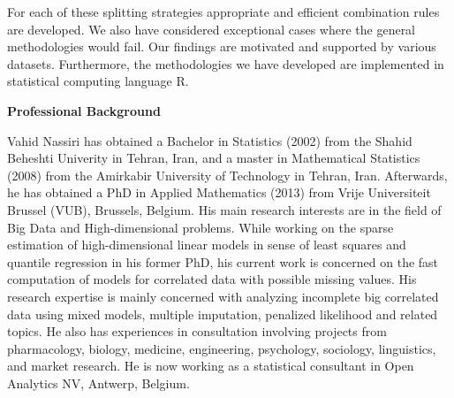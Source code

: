 \documentclass[14pt]{article}
\begin{document}
For each of these splitting strategies appropriate and efficient combination rules are developed. We also have considered exceptional cases where the general methodologies would fail. Our findings are motivated and supported by various datasets. Furthermore, the methodologies we have developed are implemented in statistical computing language R.
\vspace{1cm}
\begin{center}
{\large{\textbf{Professional Background}}}
\end{center}
\vspace{0.5cm}
Vahid Nassiri  has obtained a Bachelor in Statistics (2002) from the Shahid Beheshti Univerity in Tehran, Iran, and a master in Mathematical Statistics (2008) from the Amirkabir University of Technology in Tehran, Iran. Afterwards, he has obtained a PhD in Applied Mathematics (2013) from Vrije Universiteit Brussel (VUB), Brussels, Belgium. His main research interests are in the field of Big Data and High-dimensional problems. While working on the sparse estimation of high-dimensional linear models in sense of least squares and quantile regression in his former PhD, his current work is concerned on the fast computation of models for correlated data with possible missing values. His research expertise is mainly concerned with analyzing incomplete big correlated data using mixed models, multiple imputation, penalized likelihood and related topics. He also has experiences in consultation involving projects from pharmacology, biology, medicine, engineering, psychology, sociology, linguistics, and market research. He is now working as a statistical consultant in Open Analytics NV, Antwerp, Belgium.
\end{document}

